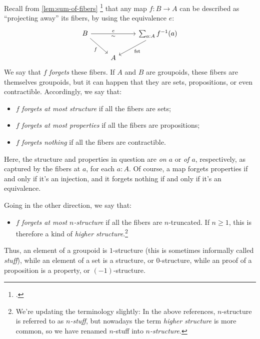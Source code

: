 Recall from \cref{lem:sum-of-fibers}%
\footcitetext{Baez-Shulman}
that any map $f : B \to A$ can be described
as ``projecting away'' its fibers,
by using the equivalence $e$:
\begin{equation}\label{eq:forget-fibers}
  \begin{tikzcd}
    B \ar[rr,"e","\sim"']\ar[dr,"f"'] & &
    \sum_{a:A} \inv f(a)\ar[dl,"\fst"] \\
    & A &
  \end{tikzcd}
\end{equation}
We say that $f$ \emph{forgets} these fibers.
If $A$ and $B$ are groupoids,
these fibers are themselves groupoids,
but it can happen that they are sets, propositions, or even contractible.
Accordingly, we say that:
\begin{itemize}
\item $f$ \emph{forgets at most structure} if all the fibers are sets;%
\item $f$ \emph{forgets at most properties} if all the fibers are propositions;%
\item $f$ \emph{forgets nothing} if all the fibers are contractible.
\end{itemize}
Here, the structure and properties in question are \emph{on $a$} or \emph{of $a$}, respectively, as captured by the fibers at $a$, for each $a:A$.
Of course, a map forgets properties if and only if
it's an injection,
and it forgets nothing if and only if it's an equivalence.

Going in the other direction,
we say that:
\begin{itemize}
\item $f$ \emph{forgets at most $n$-structure}
  if all the fibers are $n$-truncated.
  If $n\ge1$, this is therefore a kind of \emph{higher structure}.\footnote{%
    We're updating the terminology slightly: In the above references,
    $n$-structure is referred to as \emph{$n$-stuff},
    but nowadays the term \emph{higher structure} is more common,
    so we have renamed $n$-stuff into \emph{$n$-structure}.}
\end{itemize}
Thus, an element of a groupoid is $1$-structure
(this is sometimes informally called \emph{stuff}),
while an element of a set is a structure, or $0$-structure,
while an proof of a proposition is a property, or $(-1)$-structure.

